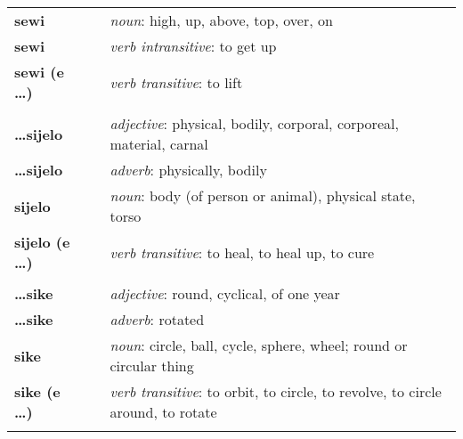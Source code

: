 \begin{supertabular}{p{2,5cm}|ll}
    \textbf{sewi}                &  & \textit{noun}: high, up, above, top, over, on                                                              \\
    \textbf{sewi}                &  & \textit{verb intransitive}: to get up                                                                      \\
    \textbf{sewi (e \dots)}      &  & \textit{verb transitive}: to lift                                                                          \\
                                 &  &                                                                                                            \\ %
    \textbf{\dots sijelo}        &  & \textit{adjective}: physical, bodily, corporal, corporeal, material, carnal                                \\
    \textbf{\dots sijelo}        &  & \textit{adverb}: physically, bodily                                                                        \\
    \textbf{sijelo}              &  & \textit{noun}: body (of person or animal), physical state, torso                                           \\
    \textbf{sijelo (e \dots)}    &  & \textit{verb transitive}: to heal, to heal up, to cure                                                     \\
                                 &  &                                                                                                            \\ %
    \textbf{\dots sike}          &  & \textit{adjective}: round, cyclical, of one year                                                           \\
    \textbf{\dots sike}          &  & \textit{adverb}: rotated                                                                                   \\
    \textbf{sike}                &  & \textit{noun}: circle, ball, cycle, sphere, wheel; round or circular thing                                 \\
    \textbf{sike (e \dots)}      &  & \textit{verb transitive}: to orbit, to circle, to revolve, to circle around, to rotate                     \\
                                 &  &                                                                                                            \\ %

\end{supertabular}
